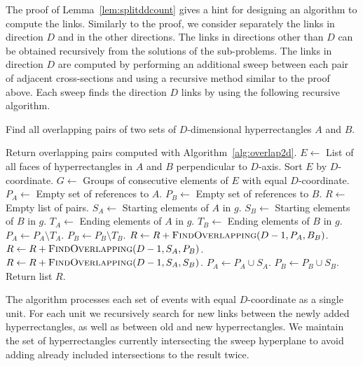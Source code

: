 \documentclass[english,gradu]{tktltiki2018}
\begin{document}
The proof of Lemma~\ref{lem:splitddcount} gives a hint for designing an algorithm to compute the links.
Similarly to the proof, we consider separately the links in direction $D$ and in the other directions.
The links in directions other than $D$ can be obtained recursively from the solutions of the sub-problems.
The links in direction $D$ are computed by performing an additional sweep between each pair of adjacent cross-sections and using a recursive method similar to the proof above.
Each sweep finds the direction $D$ links by using the following recursive algorithm.

\begin{alg}\label{alg:overlapdd}
Find all overlapping pairs of two sets of $D$-dimensional hyperrectangles $A$ and $B$.
\begin{algorithmic}
		\State Return overlapping pairs computed with Algorithm~\ref{alg:overlap2d}.
	\EndIf
	\State $E\gets$ List of all faces of hyperrectangles in $A$ and $B$ perpendicular to $D$-axis.
	\State Sort $E$ by $D$-coordinate.
	\State $G\gets$ Groups of consecutive elements of $E$ with equal $D$-coordinate.
	\State $P_A\gets$ Empty set of references to $A$.
	\State $P_B\gets$ Empty set of references to $B$.
	\State $R\gets$ Empty list of pairs.
		\State $S_A\gets$ Starting elements of $A$ in $g$.
		\State $S_B\gets$ Starting elements of $B$ in $g$.
		\State $T_A\gets$ Ending elements of $A$ in $g$.
		\State $T_B\gets$ Ending elements of $B$ in $g$.
		\State $P_A\gets P_A\setminus T_A$.
		\State $P_B\gets P_B\setminus T_B$.
		\State $R\gets R + \textsc{FindOverlapping}(D-1,P_A,B_B)$.
		\State $R\gets R + \textsc{FindOverlapping}(D-1,S_A,P_B)$.
		\State $R\gets R + \textsc{FindOverlapping}(D-1,S_A,S_B)$.
		\State $P_A\gets P_A\cup S_A$.
		\State $P_B\gets P_B\cup S_B$.
	\EndFor
	\State Return list $R$.
\EndProcedure
\end{algorithmic}
\end{alg}

The algorithm processes each set of events with equal $D$-coordinate as a single unit.
For each unit we recursively search for new links between the newly added hyperrectangles, as well as between old and new hyperrectangles.
We maintain the set of hyperrectangles currently intersecting the sweep hyperplane to avoid adding already included intersections to the result twice.
\end{document}

